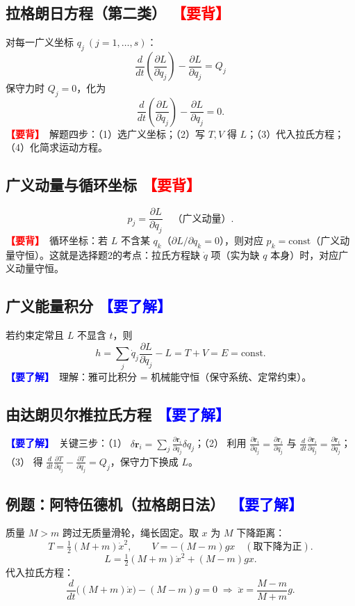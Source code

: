 \documentclass[UTF8,a4paper,11pt]{ctexart}
\newcommand{\bp}[1]{\textcolor{red}{\textbf{【要背】}}\ #1}
\newcommand{\uf}[1]{\textcolor{blue}{\textbf{【要了解】}}\ #1}
\begin{document}
\subsection{拉格朗日方程（第二类） \bp{}}
对每一广义坐标 $q_j\ (j=1,\dots,s)$：
\[
\boxed{\frac{d}{dt}\!\left(\frac{\partial L}{\partial \dot q_j}\right)-\frac{\partial L}{\partial q_j}=Q_j}
\]
保守力时 $Q_j=0$，化为
\[
\boxed{\frac{d}{dt}\!\left(\frac{\partial L}{\partial \dot q_j}\right)-\frac{\partial L}{\partial q_j}=0.}
\]
\bp{解题四步}：（1）选广义坐标；（2）写 $T,V$ 得 $L$；（3）代入拉氏方程；（4）化简求运动方程。

\subsection{广义动量与循环坐标 \bp{}}
\[
p_j=\frac{\partial L}{\partial \dot q_j}\quad\text{（广义动量）}.
\]
\bp{循环坐标}：若 $L$ 不含某 $q_k$（$\partial L/\partial q_k=0$），则对应 $p_k=\text{const}$（广义动量守恒）。这就是选择题2的考点：拉氏方程缺 $\dot q$ 项（实为缺 $q$ 本身）时，对应广义动量守恒。

\subsection{广义能量积分 \uf{}}
若约束定常且 $L$ 不显含 $t$，则
\[
h=\sum_j \dot q_j\frac{\partial L}{\partial \dot q_j}-L=T+V=E=\text{const}.
\]
\uf{理解}：雅可比积分 = 机械能守恒（保守系统、定常约束）。

\subsection{由达朗贝尔推拉氏方程 \uf{}}
\uf{关键三步}：（1） $\delta\bm r_i=\sum_j\frac{\partial\bm r_i}{\partial q_j}\delta q_j$；（2） 利用 $\frac{\partial\dot{\bm r}_i}{\partial\dot q_j}=\frac{\partial\bm r_i}{\partial q_j}$ 与 $\frac{d}{dt}\frac{\partial\bm r_i}{\partial q_j}=\frac{\partial\dot{\bm r}_i}{\partial q_j}$；（3） 得 $\frac{d}{dt}\frac{\partial T}{\partial\dot q_j}-\frac{\partial T}{\partial q_j}=Q_j$，保守力下换成 $L$。

\subsection{例题：阿特伍德机（拉格朗日法） \uf{}}
质量 $M>m$ 跨过无质量滑轮，绳长固定。取 $x$ 为 $M$ 下降距离：
\[
T=\tfrac12(M+m)\dot x^2,\qquad V=-(M-m)gx\quad(\text{取下降为正}).
\]
\[
L=\tfrac12(M+m)\dot x^2+(M-m)gx.
\]
代入拉氏方程：
\[
\frac{d}{dt}\big((M+m)\dot x\big)-(M-m)g=0
\;\Rightarrow\;
\boxed{\ddot x=\frac{M-m}{M+m}g.}
\]
\end{document}

